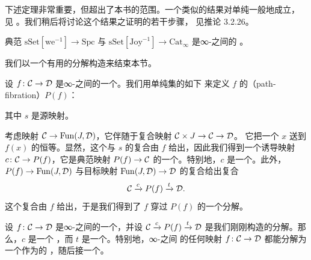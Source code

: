 下述定理非常重要，但超出了本书的范围。一个类似的结果对单纯\trModelCategory{}一般地成立，
见 \cite[Theorem 1.3.4.20]{Lur17}。我们稍后将讨论这个结果之证明的若干步骤，
见推论 3.2.26。

\begin{theorem}\label{thm:localization-canonical-equivalences}
典范\trFunctor{} $\mathrm{sSet}[\mathrm{we}^{-1}] \to \mathrm{Spc}$ 与
$\mathrm{sSet}[\mathrm{Joy}^{-1}] \to \mathrm{Cat}_\infty$ 是∞-\trCategories{}之间的%
\trEquivalence{}。
\end{theorem}

我们以一个有用的分解构造来结束本节。

\begin{definition}\label{def:path-fibration}
设 $f\colon \mathcal{C} \to \mathcal{D}$ 是∞-\trCategories{}之间的一个\trFunctor{}。我们用单纯集的如下%
\trPullback{}来定义 $f$ 的\emph{\trPathFibration{}}（path-fibration）$P(f)$：
\begin{center}
\end{center}
其中 $s$ 是源映射。
\end{definition}

考虑映射 $\mathcal{C} \to \mathrm{Fun}(J, \mathcal{D})$，它伴随于复合映射 $\mathcal{C} \times J \to \mathcal{C} \to \mathcal{D}$。
它把一个\trObject{} $x$ 送到 $f(x)$ 的恒等\trMorphism{}。显然，这个\trFunctor{}与 $s$
的复合由 $f$ 给出，因此我们得到一个诱导映射 $c\colon \mathcal{C} \to P(f)$，它是典范映射
$P(f) \to \mathcal{C}$ 的一个\trSectionMap{}。特别地，$c$ 是一个\trMonomorphism{}。此外，
$P(f) \to \mathrm{Fun}(J, \mathcal{D})$ 与目标映射 $\mathrm{Fun}(J, \mathcal{D}) \to \mathcal{D}$ 的复合给出复合
\[
\mathcal{C} \xrightarrow{c} P(f) \xrightarrow{t} \mathcal{D}.
\]
这个复合由 $f$ 给出，于是我们得到了 $f$ 穿过 $P(f)$ 的一个分解。

\begin{lemma}\label{lem:localization-factorization}
设 $f\colon \mathcal{C} \to \mathcal{D}$ 是∞-\trCategories{}之间的一个\trFunctor{}，并设
$\mathcal{C} \xrightarrow{c} P(f) \xrightarrow{t} \mathcal{D}$ 是我们刚刚构造的分解。那么，$c$ 是一个%
\trJoyalEquivalence{}，而 $t$ 是一个\trIsofibration{}。特别地，∞-\trCategories{}之间
的任何映射 $f\colon \mathcal{C} \to \mathcal{D}$ 都能分解为一个作为\trMonomorphism{}的%
\trJoyalEquivalence{}，随后接一个\trIsofibration{}。
\end{lemma}

